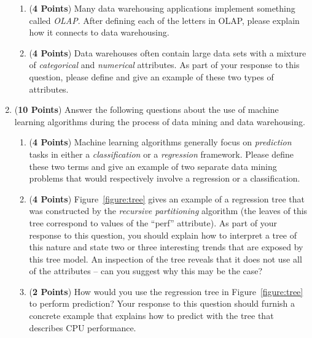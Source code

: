 \documentclass[12pt]{article}
\begin{document}
\begin{enumerate}
\begin{enumerate}
  \item ({\bf 4 Points}) Many data warehousing applications implement
    something called {\em OLAP}.  After defining each of the letters
    in OLAP, please explain how it connects to data warehousing.

  \item ({\bf 4 Points}) Data warehouses often contain large data sets
    with a mixture of {\em categorical} and {\em numerical}
    attributes.  As part of your response to this question, please
    define and give an example of these two types of attributes.


\end{enumerate}

\newpage

\item ({\bf 10 Points}) Answer the following questions about the use
  of machine learning algorithms during the process of data mining and
  data warehousing.

  \begin{enumerate}

  \item ({\bf 4 Points}) Machine learning algorithms generally focus
    on {\em prediction} tasks in either a {\em classification} or a
    {\em regression} framework.  Please define these two terms and
    give an example of two separate data mining problems that would
    respectively involve a regression or a classification.

  \item ({\bf 4 Points}) Figure~\ref{figure:tree} gives an example of
    a regression tree that was constructed by the {\em recursive
      partitioning} algorithm (the leaves of this tree correspond to
    values of the ``perf'' attribute).  As part of your response to
    this question, you should explain how to interpret a tree of this
    nature and state two or three interesting trends that are exposed
    by this tree model.  An inspection of the tree reveals that it
    does not use all of the attributes -- can you suggest why this may
    be the case?

  \item ({\bf 2 Points}) How would you use the regression tree in
    Figure~\ref{figure:tree} to perform prediction?  Your response to
    this question should furnish a concrete example that explains how
    to predict with the tree that describes CPU performance.


\end{enumerate}
\end{enumerate}
\end{document}
